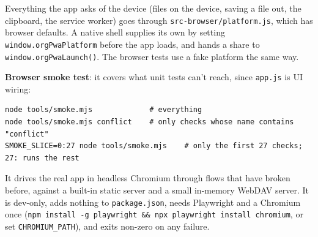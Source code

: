 \documentclass[11pt]{article}
\begin{document}
Everything the app asks of the device (files on the device, saving a file out, the clipboard, the service worker) goes through \texttt{src-browser/platform.js}, which has browser defaults. A native shell supplies its own by setting \texttt{window.orgPwaPlatform} before the app loads, and hands a share to \texttt{window.orgPwaLaunch()}. The browser tests use a fake platform the same way.

\textbf{Browser smoke test}: it covers what unit tests can't reach, since \texttt{app.js} is UI wiring:

\begin{verbatim}
node tools/smoke.mjs             # everything
node tools/smoke.mjs conflict    # only checks whose name contains "conflict"
SMOKE_SLICE=0:27 node tools/smoke.mjs    # only the first 27 checks; 27: runs the rest
\end{verbatim}

It drives the real app in headless Chromium through flows that have broken before, against a built-in static server and a small in-memory WebDAV server. It is dev-only, adds nothing to \texttt{package.json}, needs Playwright and a Chromium once (\texttt{npm install -g playwright \&\& npx playwright install chromium}, or set \texttt{CHROMIUM\_PATH}), and exits non-zero on any failure.
\end{document}
